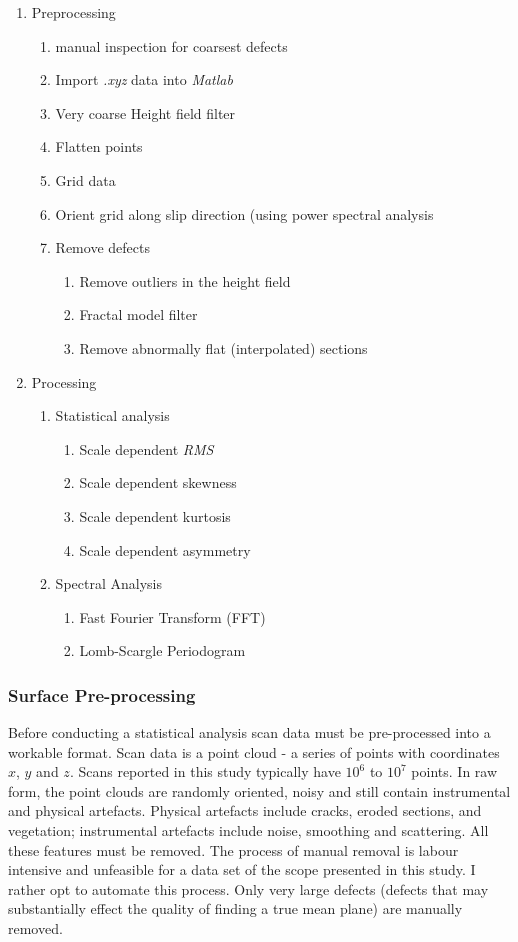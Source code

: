 \documentclass[12pt,a4paper]{article}
\begin{document}
\begin{enumerate}
	\item Preprocessing
	\begin{enumerate}
		\item manual inspection for coarsest defects
		\item Import \textit{.xyz} data into \textit{Matlab}
		\item Very coarse Height field filter
		\item Flatten points
		\item Grid data
		\item Orient grid along slip direction (using power spectral analysis 
		\item Remove defects
		\begin{enumerate}
			\item Remove outliers in the height field
			\item Fractal model filter
			\item Remove abnormally flat (interpolated) sections
		\end{enumerate}
	\end{enumerate}
	\item Processing
	\begin{enumerate}
		\item Statistical analysis
		\begin{enumerate}
			\item Scale dependent \textit{RMS}
			\item Scale dependent skewness
			\item Scale dependent kurtosis
			\item Scale dependent asymmetry
		\end{enumerate}
		\item Spectral Analysis
		\begin{enumerate}
			\item Fast Fourier Transform (FFT)
			\item Lomb-Scargle Periodogram
		\end{enumerate}
	\end{enumerate}
\end{enumerate}
  

		\subsubsection{Surface Pre-processing}

Before conducting a statistical analysis scan data must be pre-processed into a workable format. Scan data is a point cloud - a series of points with coordinates $x$, $y$ and $z$. Scans reported in this study typically have $10^6$ to $ 10^7$ points. In raw form, the point clouds are randomly oriented, noisy and still contain instrumental and physical artefacts. Physical artefacts include cracks, eroded sections, and vegetation; instrumental artefacts include noise, smoothing and scattering. All these features must be removed. The process of manual removal is labour intensive and unfeasible for a data set of the scope presented in this study. I rather opt to automate this process. Only very large defects (defects that may substantially effect the quality of finding a true mean plane) are manually removed.
\end{document}
